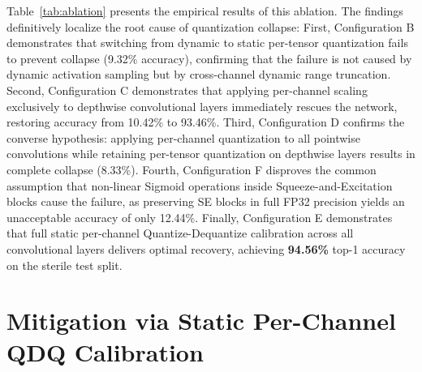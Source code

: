 \documentclass{jcse}
\begin{document}
\begin{table}
\centering
\caption{Layer-Wise Quantization Ablation on EfficientNet-B0 ($n=1,728$)}
\label{tab:ablation}
\end{table}

Table~\ref{tab:ablation} presents the empirical results of this ablation. The findings definitively localize the root cause of quantization collapse:
First, Configuration B demonstrates that switching from dynamic to static per-tensor quantization fails to prevent collapse (9.32\% accuracy), confirming that the failure is not caused by dynamic activation sampling but by cross-channel dynamic range truncation.
Second, Configuration C demonstrates that applying per-channel scaling exclusively to depthwise convolutional layers immediately rescues the network, restoring accuracy from 10.42\% to 93.46\%.
Third, Configuration D confirms the converse hypothesis: applying per-channel quantization to all pointwise convolutions while retaining per-tensor quantization on depthwise layers results in complete collapse (8.33\%).
Fourth, Configuration F disproves the common assumption that non-linear Sigmoid operations inside Squeeze-and-Excitation blocks cause the failure, as preserving SE blocks in full FP32 precision yields an unacceptable accuracy of only 12.44\%.
Finally, Configuration E demonstrates that full static per-channel Quantize-Dequantize calibration across all convolutional layers delivers optimal recovery, achieving \textbf{94.56\%} top-1 accuracy on the sterile test split.

\section{Mitigation via Static Per-Channel QDQ Calibration}
\end{document}
